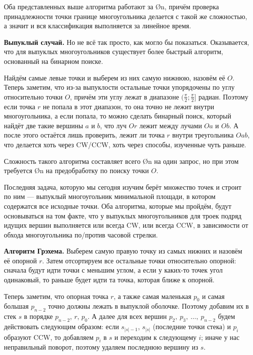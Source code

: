 Оба представленных выше алгоритма работают за \O{n}, причём проверка принадлежности точки границе многоугольника делается с такой же сложностью, а значит и вся классификация выполняется за линейное время.

\textbf{Выпуклый случай.} Но не всё так просто, как могло бы показаться. Оказывается, что для выпуклых многоугольников существует более быстрый алгоритм, основанный на бинарном поиске.

Найдём самые левые точки и выберем из них самую нижнюю, назовём её $O$. Теперь заметим, что из-за выпуклости остальные точки упорядочены по углу относительно точки $O$, причём эти углу лежат в диапазоне $(\frac{\pi}{2}; \frac{\pi}{2}]$ радиан. Поэтому если точка $r$ не попала в этот диапазон, то она точно не лежит внутри многоугольника, а если попала, то можно сделать бинарный поиск, который найдёт две такие вершины $a$ и $b$, что луч $Or$ лежит между лучами $Oa$ и $Ob$. А после этого остаётся лишь проверить, лежит ли точка $r$ внутри треугольника $Oab$, что делается хоть через CW/CCW, хоть через способы, изученные чуть раньше.

Сложность такого алгоритма составляет всего \O{\log n} на один запрос, но при этом требуется \O{n} на предобработку по поиску точки $O$.


Последняя задача, которую мы сегодня изучим берёт множество точек и строит по ним  — выпуклый многоугольник минимальной площади, в котором содержатся все исходные точки. Оба алгоритма, которые мы пройдём, будут основываться на том факте, что у выпуклых многоугольников для троек подряд идущих вершин выполняется или всегда CW, или всегда CCW, в зависимости от обхода многоугольника по/против часовой стрелки.

\textbf{Алгоритм Грэхема.} Выберем самую правую точку из самых нижних и назовём её опорной $r$. Затем отсортируем все остальные точки относительно опорной: сначала будут идти точки с меньшим углом, а если у каких-то точек угол одинаковый, то раньше будет идти та точка, которая ближе к опорной.

Теперь заметим, что опорная точка $r$, а также самая маленькая $p_0$ и самая большая $p_{n-2}$ точно должны лежать в выпуклой оболочке. Поэтому добавим их в стек $s$ в порядке $p_{n-2}$, $r$, $p_0$. А далее для всех вершин $p_2,\ p_3,\ \ldots,\ p_{n-2}$ будем действовать следующим образом: если $s_{|s|-1}$, $s_{|s|}$ (последние точки стека) и $p_i$ образуют CCW, то добавляем $p_i$ в $s$ и переходим к следующему $i$; иначе у нас неправильный поворот, поэтому удаляем последнюю вершину из $s$.

